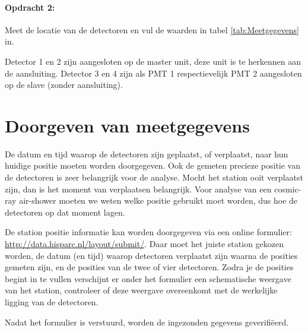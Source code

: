 \paragraph{Opdracht 2:}

Meet de locatie van de detectoren en vul de waarden in tabel
\ref{tab:Meetgegevens} in.

Detector 1 en 2 zijn aangesloten op de \hisparc master unit, deze unit is
te herkennen aan de \gps aansluiting. Detector 3 en 4 zijn als PMT 1
respectievelijk PMT 2 aangesloten op de \hisparc slave (zonder
\gps aansluiting).


\section{Doorgeven van meetgegevens}

De datum en tijd waarop de detectoren zijn geplaatst, of verplaatst,
naar hun huidige positie moeten worden doorgegeven. Ook de gemeten
precieze positie van de detectoren is zeer belangrijk voor de analyse.
Mocht het station ooit verplaatst zijn, dan is het moment van
verplaatsen belangrijk. Voor analyse van een cosmic-ray air-shower
moeten we weten welke positie gebruikt moet worden, dus hoe de
detectoren op dat moment lagen.

De station positie informatie kan worden doorgegeven via een online
formulier: \url{http://data.hisparc.nl/layout/submit/}. Daar moet het
juiste station gekozen worden, de datum (en tijd) waarop detectoren
verplaatst zijn waarna de posities gemeten zijn, en de posities van de
twee of vier detectoren. Zodra je de posities begint in te vullen
verschijnt er onder het formulier een schematische weergave van het
station, controleer of deze weergave overeenkomt met de werkelijke
ligging van de detectoren.

Nadat het formulier is verstuurd, worden de ingezonden gegevens 
geverifiëerd.


